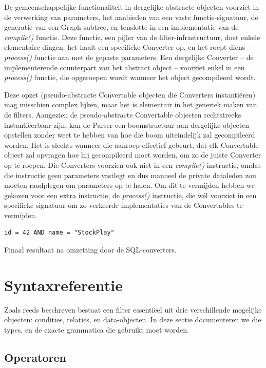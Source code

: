 De gemeenschappelijke functionaliteit in dergelijke abstracte objecten voorziet in de verwerking van parameters, het aanbieden van een vaste functie-signatuur, de generatie van een Graph-subtree, en tenslotte in een implementatie van de \emph{compile()} functie. Deze functie, een pijler van de filter-infrastructuur, doet enkele elementaire dingen: het haalt een specifieke Converter op, en het roept diens \emph{process()} functie aan met de gepaste parameters. Een dergelijke Converter -- de implementerende counterpart van het abstract object -- voorziet enkel in een \emph{process()} functie, die opgeroepen wordt wanneer het object gecompileerd wordt.

Deze opzet (pseudo-abstracte Convertable objecten die Converters instanti\"eren) mag misschien complex lijken, maar het is elementair in het generiek maken van de filters. Aangezien de pseudo-abstracte Convertable objecten rechtstreeks instanti\"eerbaar zijn, kan de Parser een boomstructuur aan dergelijke objecten opstellen zonder weet te hebben van hoe die boom uiteindelijk zal gecompileerd worden. Het is slechts wanneer die aanroep effectief gebeurt, dat elk Convertable object zal opvragen hoe hij gecompileerd moet worden, om zo de juiste Converter op te roepen. Die Converters voorzien ook niet in een \emph{compile()} instructie, omdat die instructie geen parameters vastlegt en dus manueel de private dataleden zou moeten raadplegen om parameters op te halen. Om dit te vermijden hebben we gekozen voor een extra instructie, de \emph{process()} instructie, die w\'el voorziet in een specifieke signatuur om zo verkeerde implementaties van de Convertables te vermijden.

\begin{code}
\begin{verbatim}
id = 42 AND name = "StockPlay"
\end{verbatim}
\caption{Finaal resultaat na omzetting door de SQL-converters.}
\end{code}


\section{Syntaxreferentie}

Zoals reeds beschreven bestaat een filter essenti\"eel uit drie verschillende mogelijke objecten: condities, relaties, en data-objecten. In deze sectie documenteren we die types, en de exacte grammatica die gebruikt moet worden.

\subsection{Operatoren}

